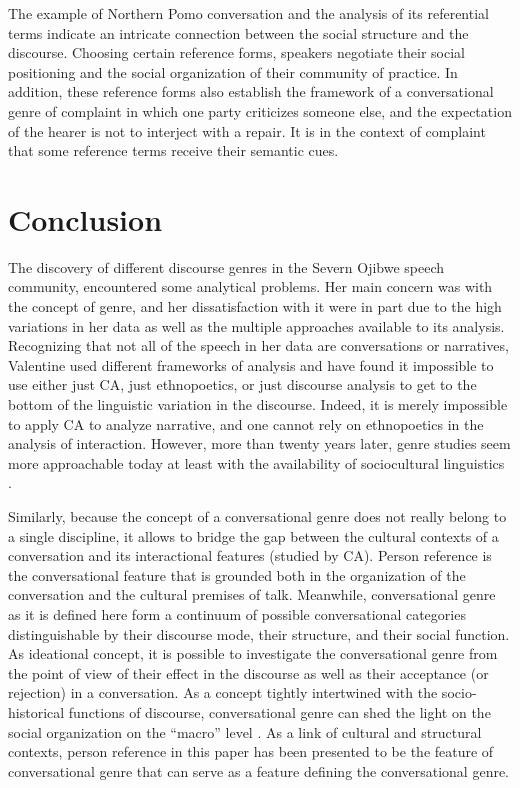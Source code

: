 \documentclass[12pt, draft]{article}
\begin{document}
The example of Northern Pomo conversation and the analysis of its referential terms indicate an intricate connection between the social structure and the discourse. Choosing certain reference forms, speakers negotiate their social positioning and the social organization of their community of practice. In addition, these reference forms also establish the framework of a conversational genre of complaint in which one party criticizes someone else, and the expectation of the hearer is not to interject with a repair. It is in the context of complaint that some reference terms receive their semantic cues. 
\section{Conclusion}
The discovery of different discourse genres in the Severn Ojibwe speech community, \textcite{valentine1995} encountered some analytical problems. Her main concern was with the concept of genre, and her dissatisfaction with it were in part due to the high variations in her data as well as the multiple approaches available to its analysis. Recognizing that not all of the speech in her data are conversations or narratives, Valentine used different frameworks of analysis and have found it impossible to use either just CA, just ethnopoetics, or just discourse analysis to get to the bottom of the linguistic variation in the discourse. Indeed, it is merely impossible to apply CA to analyze narrative, and one cannot rely on ethnopoetics in the analysis of interaction. However, more than twenty years later, genre studies seem more approachable today at least with the availability of sociocultural linguistics \parencite{bucholtz2008}.

Similarly, because the concept of a conversational genre does not really belong to a single discipline, it allows to bridge the gap between the cultural contexts of a conversation and its interactional features (studied by CA). Person reference is the conversational feature that is grounded both in the organization of the conversation and the cultural premises of talk. Meanwhile, conversational genre as it is defined here form a continuum of possible conversational categories distinguishable by their discourse mode, their structure, and their social function. As ideational concept, it is possible to investigate the conversational genre from the point of view of their effect in the discourse as well as their acceptance (or rejection) in a conversation. As a concept tightly intertwined with the socio-historical functions of discourse, conversational genre can shed the light on the social organization on the ``macro'' level \parencite{mayes2005}. As a link of cultural and structural contexts, person reference in this paper has been presented to be the feature of conversational genre that can serve as a feature defining the conversational genre.
\printbibliography
\end{document}
